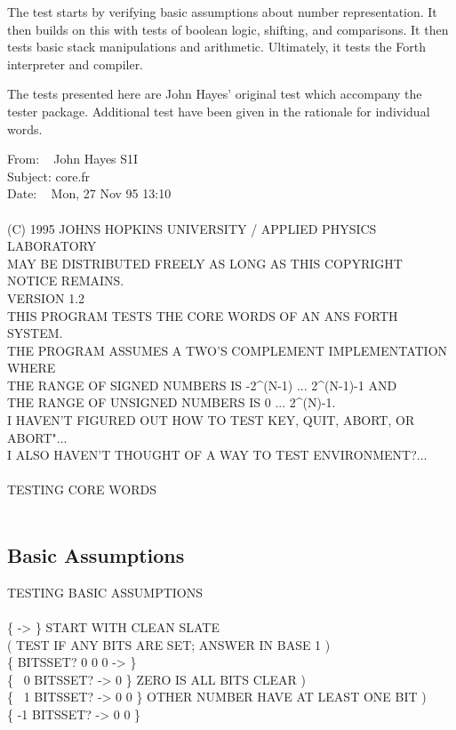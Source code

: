 The test starts by verifying basic assumptions about number
representation. It then builds on this with tests of boolean logic,
shifting, and comparisons. It then tests basic stack manipulations
and arithmetic. Ultimately, it tests the Forth interpreter and
compiler.

The tests presented here are John Hayes' original test which
accompany the tester package. Additional test have been given in
the rationale for individual words.

\begin{tt}
 From: ~ John Hayes S1I \\
 Subject: core.fr \\
 Date: ~ Mon, 27 Nov 95 13:10 \\
\\
 (C) 1995 JOHNS HOPKINS UNIVERSITY / APPLIED PHYSICS LABORATORY \\
 MAY BE DISTRIBUTED FREELY AS LONG AS THIS COPYRIGHT NOTICE REMAINS. \\
 VERSION 1.2 \\
 THIS PROGRAM TESTS THE CORE WORDS OF AN ANS FORTH SYSTEM. \\
 THE PROGRAM ASSUMES A TWO'S COMPLEMENT IMPLEMENTATION WHERE \\
 THE RANGE OF SIGNED NUMBERS IS -2\textasciicircum(N-1) ... 2\textasciicircum(N-1)-1 AND \\
 THE RANGE OF UNSIGNED NUMBERS IS 0 ... 2\textasciicircum(N)-1. \\
 I HAVEN'T FIGURED OUT HOW TO TEST KEY, QUIT, ABORT, OR ABORT"... \\
 I ALSO HAVEN'T THOUGHT OF A WAY TO TEST ENVIRONMENT?... \\
\\
TESTING CORE WORDS \\
 \\
\end{tt}

\subsection{Basic Assumptions}

\begin{tt}
TESTING BASIC ASSUMPTIONS \\
\\
\{ -> \} \tab[8]  START WITH CLEAN SLATE \\
( TEST IF ANY BITS ARE SET; ANSWER IN BASE 1 ) \\
\{ \word{:} BITSSET?  0 0  0  \word{;} -> \} \\
\{ ~0 BITSSET? -> 0 \}		\tab[2.2]  ZERO IS ALL BITS CLEAR ) \\
\{ ~1 BITSSET? -> 0 0 \}	\tab[1.0]  OTHER NUMBER HAVE AT LEAST ONE BIT ) \\
\{ -1 BITSSET? -> 0 0 \}
\end{tt}

